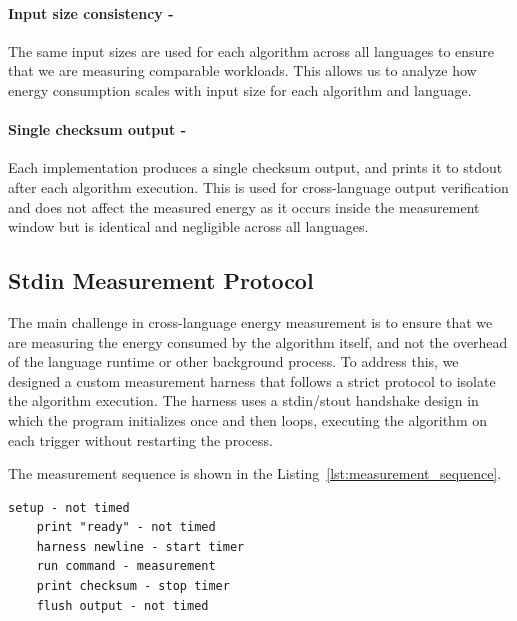 \paragraph{Input size consistency -}The same input sizes are used for each algorithm across all languages to ensure that we are measuring comparable workloads. This allows us to analyze how energy consumption scales with input size for each algorithm and language.

\paragraph{Single checksum output -}Each implementation produces a single checksum output, and prints it to stdout after each algorithm execution. This is used for cross-language output verification and does not affect the measured energy as it occurs inside the measurement window but is identical and negligible across all languages.\\


\subsection{Stdin Measurement Protocol }

The main challenge in cross-language energy measurement is to ensure that we are measuring the energy consumed by the algorithm itself, and not the overhead of the language runtime or other background process. To address this, we designed a custom measurement harness that follows a strict protocol to isolate the algorithm execution. The harness uses a stdin/stout handshake design in which the program initializes once and then loops, executing the algorithm on each trigger without restarting the process.

The measurement sequence is shown in the Listing~\ref{lst:measurement_sequence}. 
\begin{lstlisting}[caption={Measurement sequence}, label={lst:measurement_sequence}, numbers=none]
    setup - not timed
    print "ready" - not timed
    harness newline - start timer
    run command - measurement
    print checksum - stop timer
    flush output - not timed
\end{lstlisting}

